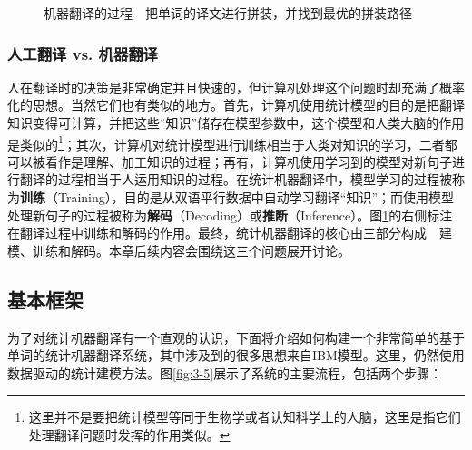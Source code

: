 \begin{figure}[htp]
    \centering

    \caption{机器翻译的过程\ \dash \ 把单词的译文进行拼装，并找到最优的拼装路径}
    \label{fig:3-4}
\end{figure}


\subsubsection{人工翻译 vs. 机器翻译}
\parinterval 人在翻译时的决策是非常确定并且快速的，但计算机处理这个问题时却充满了概率化的思想。当然它们也有类似的地方。首先，计算机使用统计模型的目的是把翻译知识变得可计算，并把这些``知识''储存在模型参数中，这个模型和人类大脑的作用是类似的\footnote{这里并不是要把统计模型等同于生物学或者认知科学上的人脑，这里是指它们处理翻译问题时发挥的作用类似。}；其次，计算机对统计模型进行训练相当于人类对知识的学习，二者都可以被看作是理解、加工知识的过程；再有，计算机使用学习到的模型对新句子进行翻译的过程相当于人运用知识的过程。在统计机器翻译中，模型学习的过程被称为{\small\sffamily\bfseries{训练}}（Training），目的是从双语平行数据中自动学习翻译``知识''；而使用模型处理新句子的过程被称为{\small\sffamily\bfseries{解码}}（Decoding）或{\small\sffamily\bfseries{推断}}（Inference）。图\ref{fig:3-4}的右侧标注在翻译过程中训练和解码的作用。最终，统计机器翻译的核心由三部分构成\ \dash \ 建模、训练和解码。本章后续内容会围绕这三个问题展开讨论。


\subsection{基本框架}

\parinterval 为了对统计机器翻译有一个直观的认识，下面将介绍如何构建一个非常简单的基于单词的统计机器翻译系统，其中涉及到的很多思想来自IBM模型。这里，仍然使用数据驱动的统计建模方法。图\ref{fig:3-5}展示了系统的主要流程，包括两个步骤：

